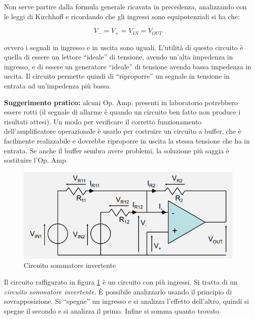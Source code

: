 \documentclass{article}
\begin{document}
\vspace{1mm}

Non serve partire dalla formula generale ricavata in precedenza, analizzando con le leggi di Kirchhoff e ricordando che gli ingressi sono equipotenziali si ha che:

\[V_- = V_+ = V_{IN} = V_{OUT}\]

ovvero i segnali in ingresso e in uscita sono uguali. L'utilità di questo circuito è quella di essere un lettore ``ideale'' di tensione, avendo un'alta impedenza in ingresso, e di essere un generatore ``ideale'' di tensione avendo bassa impedenza in uscita. Il circuito permette quindi di ``riproporre'' un segnale in tensione in entrata ad un'impedenza più bassa.

\vspace{3mm}

\textbf{Suggerimento pratico:} alcuni Op. Amp. presenti in laboratorio potrebbero essere rotti (il segnale di allarme è quando un circuito ben fatto non produce i risultati attesi). Un modo per verificare il corretto funzionamento dell'amplificatore operazionale è usarlo per costruire un circuito a buffer, che è facilmente realizzabile e dovrebbe riproporre in uscita la stessa tensione che ha in entrata. Se anche il buffer sembra avere problemi, la soluzione più saggia è sostituire l'Op. Amp.

\clearpage
\begin{figure}[h]
  \centering
  \includegraphics[scale=0.7]{IM_circuito_sommatore_invertente}
  \caption{Circuito sommatore invertente}
  \label{Schema_circuito_sommatore_invertente}
\end{figure}

Il circuito raffigurato in figura \ref{Schema_circuito_sommatore_invertente} è un circuito con più ingressi. Si tratta di un \textit{circuito sommatore invertente}. È possibile analizzarlo usando il principio di sovrapposizione. Si ``spegne'' un ingresso e si analizza l'effetto dell'altro, quindi si spegne il secondo e si analizza il primo. Infine si somma quanto trovato.
\end{document}
